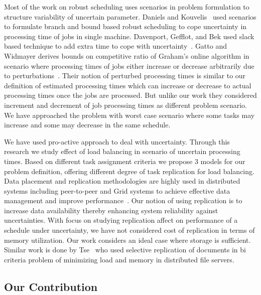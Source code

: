 \documentclass[10pt, conference, compsocconf]{IEEEtran}
\begin{document}
 Most of the work on robust scheduling uses scenarios in problem formulation to structure variability of uncertain parameter. Daniels and Kouvelis~\cite{citeulike:8334169} used scenarios to formulate branch and bound based robust scheduling to cope uncertainty in processing time of jobs in single machine. Davenport, Gefflot, and Bek used slack based technique to add extra time to cope with uncertainty~\cite{Davenport_slack-basedtechniques}. Gatto and Widmayer derives bounds on competitive ratio of Graham’s online algorithm in scenario where processing times of jobs either increase or decrease arbitrarily due to perturbations~\cite{Gatto07}.  Their notion of perturbed processing times is similar to our definition of estimated processing times which can increase or decrease to actual processing times once the jobs are processed. But unlike our work they considered increment and decrement of job processing times as different problem scenario. We have approached the problem with worst case scenario where some tasks may increase and some may decrease in the same schedule.
  
 We have used pro-active approach to deal with uncertainty. Through this research we study effect of load balancing in scenario of uncertain processing times. Based on different task assignment criteria we  propose 3 models for our problem definition, offering different degree of task replication for load balancing. Data placement and replication  methodologies are highly used in distributed systems including peer-to-peer and Grid systems to achieve effective data management and improve performance~\cite{Cirne2007213}\cite{Abawajy}\cite{4215379}. Our notion of using replication is to increase data availability thereby enhancing system reliability against uncertainties. With focus on studying replication affect on  performance of a schedule under uncertainty, we have not considered cost of replication in terms of memory utilization. Our work considers an ideal case where storage is sufficient.  Similar work is done by Tse~\cite{DBLP:journals/tc/Tse12} who used selective replication of documents in bi criteria problem of minimizing load and memory in distributed file servers.


\subsection{Our Contribution}
\end{document}
